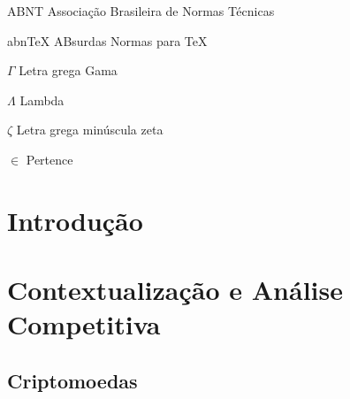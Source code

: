 \documentclass[
	article,			%
	12pt,				%
	openright,			%
	oneside,			%
	a4paper,			%
	chapter=TITLE,		%
	section=TITLE,		%
	subsection=TITLE,	%
	subsubsection=TITLE,%
	subsubsubsection=TITLE, %
	english,			%
	brazil,				%
	]{abntex2}
\begin{document}

\listoffigures*
\cleardoublepage

\listoftables*
\cleardoublepage

\begin{siglas}
  \item[ABNT] Associação Brasileira de Normas Técnicas
  \item[abnTeX] ABsurdas Normas para TeX
\end{siglas}

\begin{simbolos}
  \item[$ \Gamma $] Letra grega Gama
  \item[$ \Lambda $] Lambda
  \item[$ \zeta $] Letra grega minúscula zeta
  \item[$ \in $] Pertence
\end{simbolos}

\tableofcontents*
\cleardoublepage


\textual

\section[Introdução]{Introdução}

\section{Contextualização e Análise Competitiva}

\subsection{Criptomoedas}
\end{document}
